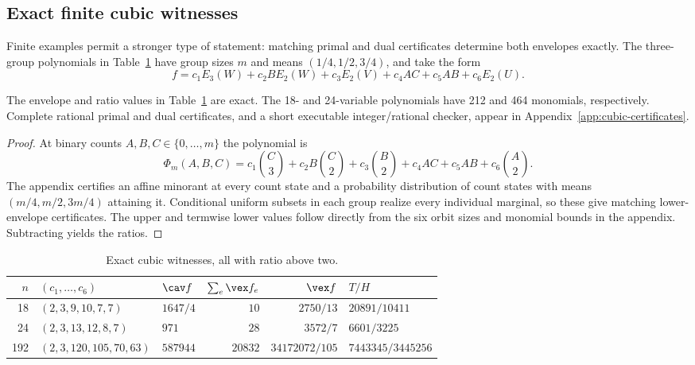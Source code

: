 \subsection{Exact finite cubic witnesses}
Finite examples permit a stronger type of statement: matching primal and
dual certificates determine both envelopes exactly. The three-group
polynomials in Table~\ref{tab:cubic-finite} have group sizes $m$ and
means $(1/4,1/2,3/4)$, and take the form
\begin{equation}\label{eq:cubic-six-family}
 f=c_1E_3(W)+c_2B E_2(W)+c_3E_2(V)+c_4AC+c_5AB+c_6E_2(U).
\end{equation}

\begin{proposition}\label{prop:cubic-finite}
The envelope and ratio values in Table~\ref{tab:cubic-finite} are exact.
The 18- and 24-variable polynomials have 212 and 464 monomials,
respectively. Complete rational primal and dual certificates, and a
short executable integer/rational checker, appear in
Appendix~\ref{app:cubic-certificates}.
\end{proposition}
\begin{proof}
At binary counts $A,B,C\in\{0,\ldots,m\}$ the polynomial is
\[
 \Phi_m(A,B,C)=c_1\binom C3+c_2B\binom C2+c_3\binom B2
              +c_4AC+c_5AB+c_6\binom A2.
\]
The appendix certifies an affine minorant at every count state and a
probability distribution of count states with means $(m/4,m/2,3m/4)$
attaining it. Conditional uniform subsets in each group realize every
individual marginal, so these give matching lower-envelope certificates.
The upper and termwise lower values follow directly from the six orbit
sizes and monomial bounds in the appendix. Subtracting yields the ratios.
\end{proof}

\begin{table}[htbp]
\centering\small
\begin{tabular}{rllrrl}
\toprule
$n$&$(c_1,\ldots,c_6)$&$\cav f$&$\sum_e\vex f_e$&$\vex f$&$T/H$\\\midrule
18&$(2,3,9,10,7,7)$&$1647/4$&$10$&$2750/13$&$20891/10411$\\
24&$(2,3,13,12,8,7)$&$971$&$28$&$3572/7$&$6601/3225$\\
192&$(2,3,120,105,70,63)$&$587944$&$20832$&$34172072/105$&$7443345/3445256$\\\bottomrule
\end{tabular}
\caption{Exact cubic witnesses, all with ratio above two.}
\label{tab:cubic-finite}
\end{table}

